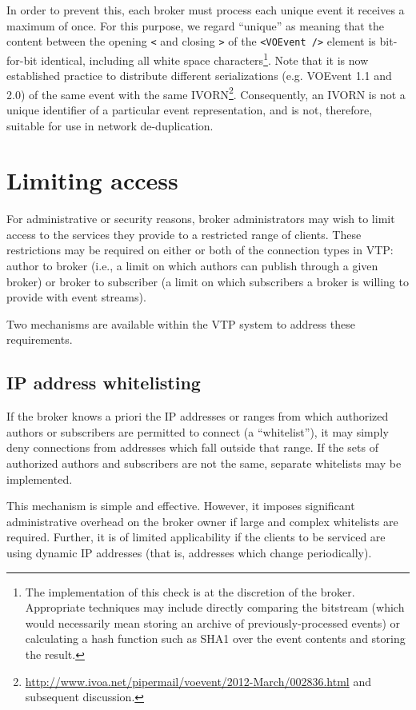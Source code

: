 \documentclass[a4paper,11pt]{ivoa}
\begin{document}
In order to prevent this, each broker must process each unique event it
receives a maximum of once. For this purpose, we regard ``unique'' as meaning
that the content between the opening \texttt{<} and closing \texttt{>} of the
\texttt{<VOEvent~/>} element is bit-for-bit identical, including all white
space characters\footnote{The implementation of this check is at the
discretion of the broker. Appropriate techniques may include directly
comparing the bitstream (which would necessarily mean storing an archive of
previously-processed events) or calculating a hash function such as SHA1
\citep{Eastlake:2001} over the event contents and storing the result.}. Note
that it is now established practice to distribute different serializations
(e.g.  VOEvent 1.1 and 2.0) of the same event with the same
IVORN\footnote{\url{http://www.ivoa.net/pipermail/voevent/2012-March/002836.html}
and subsequent discussion.}.  Consequently, an IVORN is not a unique
identifier of a particular event representation, and is not, therefore,
suitable for use in network de-duplication.

\section{Limiting access}
\label{sec:limit}

For administrative or security reasons, broker administrators may wish to
limit access to the services they provide to a restricted range of clients.
These restrictions may be required on either or both of the connection types
in VTP: author to broker (i.e., a limit on which authors can publish through a
given broker) or broker to subscriber (a limit on which subscribers a broker
is willing to provide with event streams).

Two mechanisms are available within the VTP system to address these
requirements.

\subsection{IP address whitelisting}
\label{sec:limit:whitelist}

If the broker knows a priori the IP addresses or ranges from which authorized
authors or subscribers are permitted to connect (a ``whitelist''), it may
simply deny connections from addresses which fall outside that range. If the
sets of authorized authors and subscribers are not the same, separate
whitelists may be implemented.

This mechanism is simple and effective. However, it imposes significant
administrative overhead on the broker owner if large and complex whitelists
are required. Further, it is of limited applicability if the clients to be
serviced are using dynamic IP addresses (that is, addresses which change
periodically).
\end{document}
